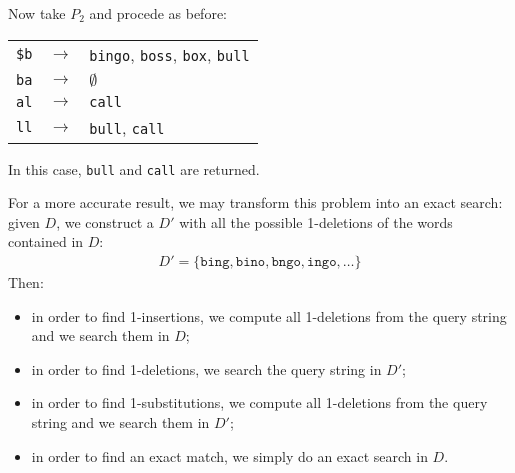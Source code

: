 Now take $P_2$ and procede as before:
%
\begin{longtable}{ccl}
  \texttt{\$b} & $\rightarrow$ & \texttt{bingo}, \texttt{boss},
  \texttt{box}, \texttt{bull} \\
  \texttt{ba} & $\rightarrow$ & $\emptyset$ \\
  \texttt{al} & $\rightarrow$ & \texttt{call} \\
  \texttt{ll} & $\rightarrow$ & \texttt{bull}, \texttt{call}
\end{longtable}
%
In this case, \texttt{bull} and \texttt{call} are returned.

For a more accurate result, we may transform this problem into an exact search:
given $D$, we construct a $D'$ with all the possible 1-deletions of the words
contained in $D$:
%
\begin{align*}
  D' = \{ \texttt{bing}, \texttt{bino}, \texttt{bngo}, \texttt{ingo}, \dots \}
\end{align*}
%
Then:
%
\begin{itemize}

  \item in order to find 1-insertions, we compute all 1-deletions from the query
  string and we search them in $D$;

  \item in order to find 1-deletions, we search the query string in $D'$;

  \item in order to find 1-substitutions, we compute all 1-deletions from the
  query string and we search them in $D'$;

  \item in order to find an exact match, we simply do an exact search in $D$.

\end{itemize}
